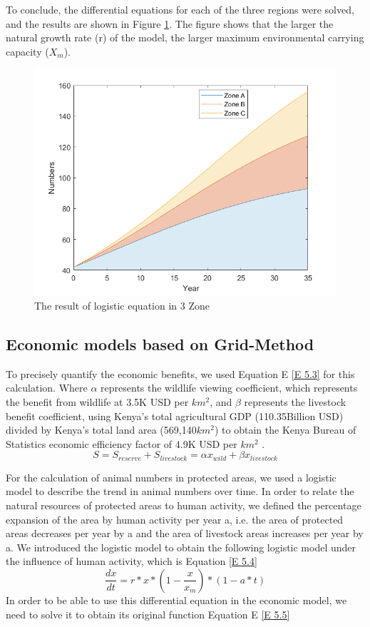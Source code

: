 \documentclass{mcmthesis}
\numberwithin{figure}{section}
\numberwithin{table}{section}
\numberwithin{equation}{section}
\begin{document}
To conclude, the differential equations for each of the three regions were solved, and the results are shown in Figure \ref{F 5.4}. The figure shows that the larger the natural growth rate (r) of the model, the larger maximum environmental carrying capacity ($X_m$).

\begin{figure}
	\centering
	\includegraphics[width=0.5\linewidth]{"figures/F 5.4"}
	\caption{The result of logistic equation in 3 Zone}
	\label{F 5.4}
\end{figure}

\subsection{Economic models based on Grid-Method}
To precisely quantify the economic benefits, we used Equation E \ref{E 5.3} for this calculation. Where $\alpha$ represents the wildlife viewing coefficient, which represents the benefit from wildlife at 3.5K USD per $km^2$, and $\beta$ represents the livestock benefit coefficient, using Kenya's total agricultural GDP (110.35Billion USD) divided by Kenya's total land area (569,140$km^2$) to obtain the Kenya Bureau of Statistics economic efficiency factor of 4.9K USD per $km^2$ \cite{5}.
\large{
\begin{equation}
	S=S_{reserve}+S_{livestock}=\alpha x_{wild}+\beta x_{livestock}
	\label{E 5.3}
\end{equation}
}

For the calculation of animal numbers in protected areas, we used a logistic model to describe the trend in animal numbers over time. In order to relate the natural resources of protected areas to human activity, we defined the percentage expansion of the area by human activity per year a, i.e. the area of protected areas decreases per year by a and the area of livestock areas increases per year by a. We introduced the logistic model to obtain the following logistic model under the influence of human activity, which is Equation \ref{E 5.4}
\begin{equation}
\frac{dx}{dt}=r*x*(1-\frac{x}{x_m})*(1-a*t)
\label{E 5.4}
\end{equation}
In order to be able to use this differential equation in the economic model, we need to solve it to obtain its original function Equation E \ref{E 5.5} 
\end{document}
